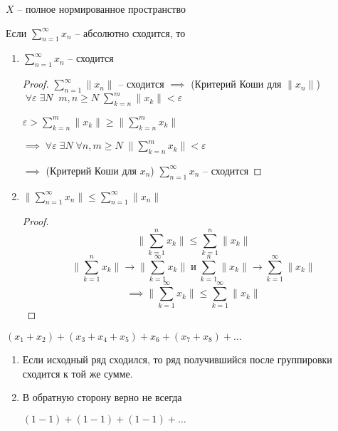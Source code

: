 \begin{theorem} \thmslashn 

	$X$ -- полное нормированное пространство

	Если $\sum\limits_{n=1}^{\infty}x_n$ -- абсолютно сходится, то
	\begin{enumerate}
		\item $\sum\limits_{n=1}^{\infty}x_n$ -- сходится 
		
		\begin{proof} \thmslashn 

			$\sum\limits_{n=1}^{\infty}\|x_n\|$ -- сходится $\implies$ (Критерий Коши для $\|x_n\|$) $\;\forall \varepsilon\; \exists N \;\; m,n\ge N \; \sum\limits_{k=n}^{m}\|x_k\|< \varepsilon$

			$\varepsilon > \sum\limits_{k=n}^{m}\|x_k\| \ge \|\sum\limits_{k=n}^{m}x_k\|$
	
			$\implies\; \forall \varepsilon \; \exists N \; \forall n,m \ge N\; \|\sum\limits_{k=n}^{m}x_k\| < \varepsilon$
			
			$\implies$ (Критерий Коши для $x_n$) $\sum\limits_{n=1}^{\infty}x_n$ -- сходится
		\end{proof}

		\item $\|\sum\limits_{n=1}^{\infty}x_n\| \le \sum\limits_{n=1}^{\infty}\|x_n\|$
		
		\begin{proof} \thmslashn 
			\[
				\|\sum\limits_{k = 1}^{n}x_k\| \le \sum\limits_{k = 1}^{n}\|x_k\|
			\]
			\[
				\|\sum\limits_{k = 1}^{n}x_k\| \to \|\sum\limits_{k = 1}^{\infty}x_k\|\;\text{и}\;\sum\limits_{k = 1}^{n}\|x_k\|\to\sum\limits_{k = 1}^{\infty}\|x_k\|
			\]
			\[
				\implies \|\sum\limits_{k = 1}^{\infty}x_k\| \le \sum\limits_{k = 1}^{\infty}\|x_k\|
			\]
		\end{proof}
	\end{enumerate} 
\end{theorem}

\begin{definition} \thmslashn 

	$(x_1 + x_2) + (x_3 + x_4 + x_5) + x_6 + (x_7 + x_8)+\ldots$
\end{definition}

\begin{remark}\thmslashn

	\begin{enumerate}
		\item Если исходный ряд сходился, то ряд получившийся после группировки сходится к той же сумме.
		\item В обратную сторону верно не всегда
		\begin{example}
			$(1 - 1)+(1- 1) + (1-1)+\ldots$
		\end{example}
	\end{enumerate}
\end{remark}

